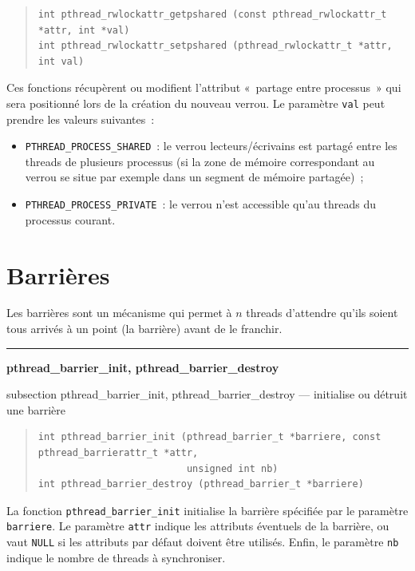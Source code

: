 \documentclass [twoside] {report}
\newcommand {\primitive} [1]
    {
	\phantomsection
	{\large \textbf {#1}}
	\addcontentsline {toc} {subsection} {#1}
    }
\newcommand {\separation}
    {
	\vspace {5mm}
	\nopagebreak
	\hrule
    }
\begin{document}
\begin {quote}
\begin {verbatim}
int pthread_rwlockattr_getpshared (const pthread_rwlockattr_t *attr, int *val)
int pthread_rwlockattr_setpshared (pthread_rwlockattr_t *attr, int val)
\end{verbatim}
\end {quote}

Ces fonctions récupèrent ou modifient l'attribut «~partage entre
processus~» qui sera positionné lors de la création du nouveau
verrou. Le paramètre \texttt {val} peut prendre les valeurs suivantes~:

\begin {itemize}
    \item \verb|PTHREAD_PROCESS_SHARED|~: le verrou lecteurs/écrivains
	est partagé entre les threads de plusieurs processus (si la zone
	de mémoire correspondant au verrou se situe par exemple dans un
	segment de mémoire partagée)~;
    \item \verb|PTHREAD_PROCESS_PRIVATE|~: le verrou n'est accessible
	qu'au threads du processus courant.
\end {itemize}


\section {Barrières}

Les barrières sont un mécanisme qui permet à $n$ threads d'attendre
qu'ils soient tous arrivés à un point (la barrière) avant de le
franchir.

\separation
\primitive {pthread\_barrier\_init, pthread\_barrier\_destroy} --- initialise ou détruit une barrière

\begin {quote}
\begin {verbatim}
int pthread_barrier_init (pthread_barrier_t *barriere, const pthread_barrierattr_t *attr,
                          unsigned int nb)
int pthread_barrier_destroy (pthread_barrier_t *barriere)
\end{verbatim}
\end {quote}

La fonction \verb|pthread_barrier_init| initialise la barrière
spécifiée par le paramètre \texttt {barriere}.  Le paramètre \texttt
{attr} indique les attributs éventuels de la barrière, ou vaut \texttt
{NULL} si les attributs par défaut doivent être utilisés. Enfin,
le paramètre \texttt {nb} indique le nombre de threads à synchroniser.
\end{document}
